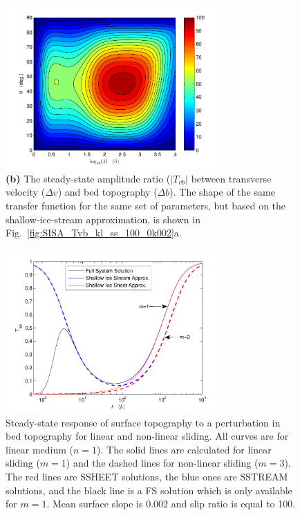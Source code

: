 \documentclass[10pt,a4paper]{book}
\newcommand{\T}{T}
\begin{document}
\begin{figure}
\vspace*{2mm}
\centerline{\includegraphics[width=8.3cm]{tc-2007-0016-f08b.pdf}}
\caption{{\bf (b)} The steady-state amplitude ratio ($|\T_{vb}|$ between
transverse velocity ($\Delta v$) and bed topography ($\Delta b$).  The shape of the same
transfer function for the same set of parameters, but based on the
shallow-ice-stream approximation, is shown in
Fig.~\ref{fig:SISA_Tvb_kl_ss_100_0k002}a.
\label{fig:Tvb_kl_ss_100_0k002}}
\end{figure}

\clearpage


\begin{figure}
\vspace*{2mm}
\centerline{\includegraphics[width=8.3cm]{tc-2007-0016-f09.pdf}}
\caption{Steady-state response of surface topography
to a perturbation in bed topography for linear and non-linear
sliding. All curves are for linear medium ($n{=}1$). The solid lines are
calculated for linear sliding ($m{=}1$) and the dashed lines for
non-linear sliding ($m{=}3$). The red lines are SSHEET solutions, the
blue ones are SSTREAM solutions, and the black line is a FS
solution which is only available for $m{=}1$. Mean surface slope is
0.002 and slip ratio is equal to 100.
\label{fig:Tsbm}}
\end{figure}
\end{document}
